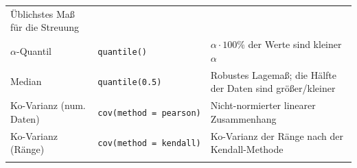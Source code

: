 \documentclass[]{book}
\begin{document}
\begin{longtable}[]{@{}lll@{}}
\begin{minipage}[t]{0.46\columnwidth}
Üblichstes Maß für die Streuung\strut
\end{minipage}\tabularnewline
\begin{minipage}[t]{0.13\columnwidth}\raggedright\strut
\(\alpha\)-Quantil\strut
\end{minipage} & \begin{minipage}[t]{0.33\columnwidth}\raggedright\strut
\texttt{quantile()}\strut
\end{minipage} & \begin{minipage}[t]{0.46\columnwidth}\raggedright\strut
\(\alpha\cdot 100\%\) der Werte sind kleiner \(\alpha\)\strut
\end{minipage}\tabularnewline
\begin{minipage}[t]{0.13\columnwidth}\raggedright\strut
Median\strut
\end{minipage} & \begin{minipage}[t]{0.33\columnwidth}\raggedright\strut
\texttt{quantile(0.5)}\strut
\end{minipage} & \begin{minipage}[t]{0.46\columnwidth}\raggedright\strut
Robustes Lagemaß; die Hälfte der Daten sind größer/kleiner\strut
\end{minipage}\tabularnewline
\begin{minipage}[t]{0.13\columnwidth}\raggedright\strut
Ko-Varianz (num. Daten)\strut
\end{minipage} & \begin{minipage}[t]{0.33\columnwidth}\raggedright\strut
\texttt{cov(method\ =\ \textquotesingle{}pearson\textquotesingle{})}\strut
\end{minipage} & \begin{minipage}[t]{0.46\columnwidth}\raggedright\strut
Nicht-normierter linearer Zusammenhang\strut
\end{minipage}\tabularnewline
\begin{minipage}[t]{0.13\columnwidth}\raggedright\strut
Ko-Varianz (Ränge)\strut
\end{minipage} & \begin{minipage}[t]{0.33\columnwidth}\raggedright\strut
\texttt{cov(method\ =\ \textquotesingle{}kendall\textquotesingle{})}\strut
\end{minipage} & \begin{minipage}[t]{0.46\columnwidth}\raggedright\strut
Ko-Varianz der Ränge nach der Kendall-Methode\strut
\end{minipage}\tabularnewline
\begin{minipage}[t]{0.13\columnwidth}\raggedright\strut

\end{minipage}
\end{longtable}
\end{document}
